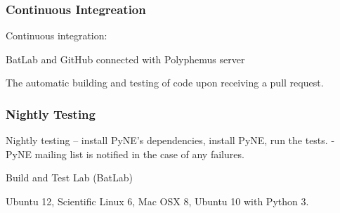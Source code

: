 \documentclass[12pt]{beamer}
\begin{document}
\begin{frame}
\frametitle{Continuous Integreation}
Continuous integration:

BatLab and GitHub connected with Polyphemus server

The automatic building and testing of code upon receiving a pull request.

\cite{beck1998extreme}
\cite{batlab_2014}
\cite{polyphemus_2014}


\end{frame}
\begin{frame}
\frametitle{Nightly Testing}

Nightly testing -- install PyNE's dependencies, install PyNE, run the tests.
- PyNE mailing list is notified in the case of any failures.

Build and Test Lab (BatLab)

Ubuntu 12, Scientific Linux 6, Mac OSX 8, Ubuntu 10 with Python 3.
\end{frame}
\end{document}
